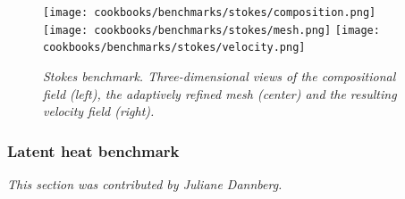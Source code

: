 \documentclass{article}
\begin{document}
\begin{figure}
  \begin{center}
    \texttt{[image: cookbooks/benchmarks/stokes/composition.png]}
    \hfill
    \texttt{[image: cookbooks/benchmarks/stokes/mesh.png]}
    \hfill
    \texttt{[image: cookbooks/benchmarks/stokes/velocity.png]}
  \end{center}
  \caption{\it Stokes benchmark. Three-dimensional views of the compositional
  field (left), the adaptively refined mesh (center) and the resulting velocity field
  (right).}
  \label{fig:stokes-falling-sphere-3d}
\end{figure}


\subsubsection{Latent heat benchmark}
\label{sec:benchmark-latent_heat}

\textit{This section was contributed by Juliane Dannberg.}
\end{document}
